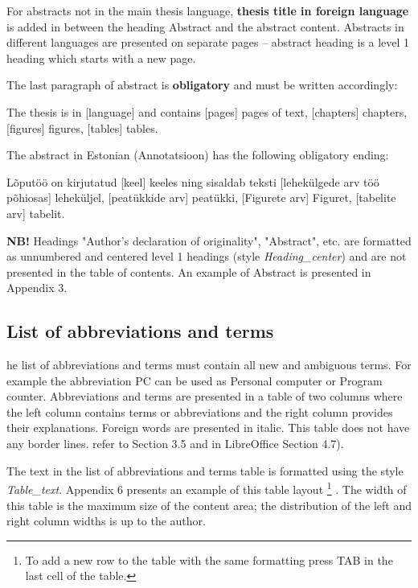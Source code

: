 For abstracts not in the main thesis language, \textbf{thesis title in
  foreign language} is added in between the heading Abstract and the
abstract content. Abstracts in different languages are presented on
separate pages -- abstract heading is a level 1 heading which starts
with a new page.

The last paragraph of abstract is \textbf{obligatory} and must be
written accordingly:

\begin{tcolorbox}[arc=0pt, outer arc=0pt, boxrule=0pt, left=0mm]
  The thesis is in [language] and contains [pages] pages of text, [chapters] chapters,
  [figures] figures, [tables] tables.
\end{tcolorbox}\vspace{-10pt}

The abstract in Estonian (Annotatsioon) has the following obligatory ending:

\begin{tcolorbox}[arc=0pt, outer arc=0pt, boxrule=0pt, left=0mm]
  Lõputöö on kirjutatud [keel] keeles ning sisaldab teksti [lehekülgede
  arv töö põhiosas] leheküljel, [peatükkide arv] peatükki, [Figurete
  arv] Figuret, [tabelite arv] tabelit.
\end{tcolorbox}\vspace{-10pt}

\textbf{NB!} Headings "Author’s declaration of originality",
"Abstract", etc. are formatted as unnumbered and centered level 1
headings (style \textit{Heading\_center}) and are not presented in the
table of contents. An example of Abstract is presented in Appendix 3.

\subsection{List of abbreviations and terms}


he list of abbreviations and terms must contain all new and ambiguous
terms. For example the abbreviation PC can be used as Personal
computer or Program counter. Abbreviations and terms are presented in
a table of two columns where the left column contains terms or
abbreviations and the right column provides their
explanations. Foreign words are presented in italic. This table does
not have any border lines. %
refer to Section 3.5 and in LibreOffice Section 4.7).

The text in the list of abbreviations and terms table is formatted
using the style \textit{Table\_text}.  Appendix 6 presents an example
of this table layout \footnote{To add a new row to the table with the
  same formatting press TAB in the last cell of the table.} . The width
of this table is the maximum size of the content area; the
distribution of the left and right column widths is up to the author.

